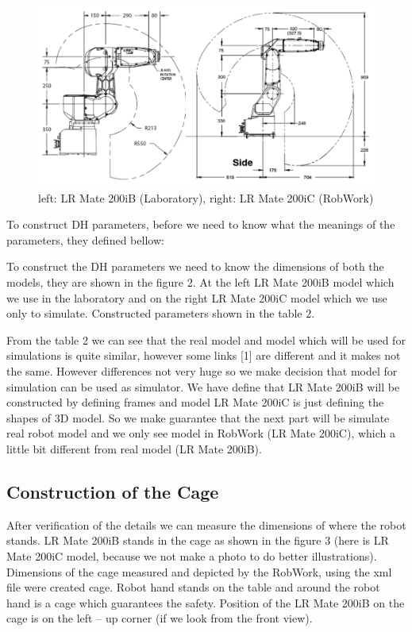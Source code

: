 \begin{figure}[H]
  \centering
  \includegraphics[scale= 0.45]{source/ModelsDimensions.png}
  \caption{left: LR Mate 200iB (Laboratory), right: LR Mate 200iC (RobWork)}
  \label{fig:ModelsDimensions}
\end{figure}

To construct DH parameters, before we need to know what the meanings of the parameters, they defined bellow:


To construct the DH parameters we need to know the dimensions of both the models, they are shown in the figure 2. At the left LR Mate 200iB model which we use in the laboratory and on the right LR Mate 200iC model which we use only to simulate. Constructed parameters shown in the table 2. 


From the table 2 we can see that the real model and model which will be used for simulations is quite similar, however some links [1] are different and it makes not the same. However differences not very huge so we make decision that model for simulation can be used as simulator. We have define that LR Mate 200iB will be constructed by defining frames and model LR Mate 200iC is just defining the shapes of 3D model. So we make guarantee that the next part will be simulate real robot model and we only see model in RobWork (LR Mate 200iC), which a little bit different from real model (LR Mate 200iB).

\subsection{Construction of the Cage}
After verification of the details we can measure the dimensions of where the robot stands. LR Mate 200iB stands in the cage as shown in the figure 3 (here is LR Mate 200iC model, because we not make a photo to do better illustrations). Dimensions of the cage measured and depicted by the RobWork, using the xml file were created cage. Robot hand stands on the table and around the robot hand is a cage which guarantees the safety. Position of the LR Mate 200iB on the cage is on the left – up corner (if we look from the front view).

